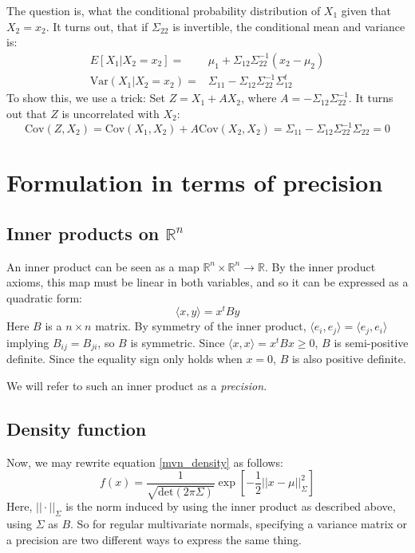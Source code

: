 \documentclass[12pt, a4paper]{article}
\numberwithin{equation}{section}
\begin{document}
The question is, what the conditional probability distribution of $X_1$ given that $X_2=x_2$. It turns out, that if $\Sigma_{22}$ is invertible, the conditional mean and variance is:
\begin{align}
E[X_1|X_2=x_2]=&\mu_1+\Sigma_{12}\Sigma_{22}^{-1}(x_2-\mu_2)\\
\textrm{Var}(X_1|X_2=x_2)=&\Sigma_{11}-\Sigma_{12}\Sigma_{22}^{-1}\Sigma_{12}^t
\end{align}
To show this, we use a trick: Set $Z=X_1+AX_2$, where $A=-\Sigma_{12}\Sigma_{22}^{-1}$. It turns out that $Z$ is uncorrelated with $X_2$:
\begin{equation}
\textrm{Cov}(Z,X_2)=\textrm{Cov}(X_1,X_2)+A\textrm{Cov}(X_2,X_2)=\Sigma_{11}-\Sigma_{12}\Sigma_{22}^{-1}\Sigma_{22}=0
\end{equation}

\section{Formulation in terms of precision}

\subsection{Inner products on $\mathbb{R}^n$}
An inner product can be seen as a map $\mathbb{R}^n\times\mathbb{R}^n\rightarrow\mathbb{R}$. By the inner product axioms, this map must be linear in both variables, and so it can be expressed as a quadratic form:
\begin{equation}
\langle x,y\rangle=x^t By
\end{equation}
Here $B$ is a $n\times n$ matrix. By symmetry of the inner product, $\langle e_i,e_j\rangle=\langle e_j,e_i\rangle$ implying $B_{ij}=B_{ji}$, so $B$ is symmetric. Since $\langle x,x\rangle=x^t Bx\ge 0$, $B$ is semi-positive definite. Since the equality sign only holds when $x=0$, $B$ is also positive definite.

We will refer to such an inner product as a \textit{precision}.

\subsection{Density function}
Now, we may rewrite equation \ref{mvn_density} as follows:
\begin{equation}
f(x)=\frac{1}{\sqrt{\textrm{det}(2\pi\Sigma)}}\exp\left[-\frac{1}{2}||x-\mu||_\Sigma^2\right]
\end{equation}
Here, $||\cdot||_\Sigma$ is the norm induced by using the inner product as described above, using $\Sigma$ as $B$. So for regular multivariate normals, specifying a variance matrix or a precision are two different ways to express the same thing.
\end{document}
